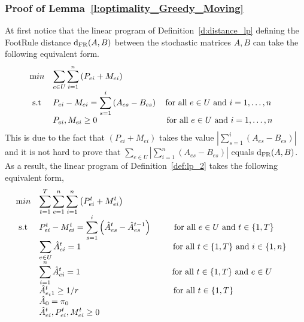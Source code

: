 \subsubsection{Proof of Lemma~\ref{l:optimality_Greedy_Moving}}
At first notice that the linear program of Definition~\ref{d:distance_lp} defining the FootRule distance $\mathrm{d}_{\mathrm{FR}}(A,B)$ between the stochastic matrices $A,B$ can take the following equivalent form. 
\begin{equation*}
    \begin{array}{ll@{}ll}
        \text min & \displaystyle \sum_{e \in U} \sum_{i = 1}^{n} \left(P_{ei} + M_{ei}\right) &\\
        \text{ s.t } & P_{ei} - M_{ei} = \displaystyle \sum_{s=1}^i \left(A_{es} - B_{es}\right)~~~\text{for all }e\in U \text{ and } i= 1,\ldots,n &&\\
        & P_{ei},M_{ei}\geq 0~~~~~~~~~~~~~~~~~~~~~~~~~\text{for all }e\in U \text{ and } i= 1,\ldots,n &\\
    \end{array}
\end{equation*}
\noindent This is due to the fact that 
$\left(P_{ei} + M_{ei}\right)$ takes the value $|\sum_{s=1}^i \left(A_{es} - B_{es}\right)|$ and it is not hard to prove that $\sum_{e \in U} |\sum_{i = 1}^{n}\left(A_{es} - B_{es}\right)|$ equals $\mathrm{d}_{\mathrm{FR}}(A,B)$. As a result, the linear program of Definition~\ref{def:lp_2} takes the following equivalent form,
\begin{equation*}
    \begin{array}{ll@{}ll}
        \text min & \displaystyle \sum_{t=1}^T\sum_{e = 1}^{n} \sum_{i = 1}^{n} \left(P_{ei}^t + M_{ei}^t\right) &\\
        \text{ s.t } & P_{ei}^t - M_{ei}^t = \displaystyle \sum_{s=1}^i \left(\hat{A}_{es}^t - \hat{A}_{es}^{t-1}\right)~~~~~~~~\text{for all }e\in U \text{ and } t \in \{1,T\} &&\\
        & \displaystyle \sum_{e \in U} \hat{A}_{ei}^t = 1 ~~~~~~~~~~~~~~~~~~~~~~~~~~~~~~~~~\text{for all }t \in \{1,T\} \text{ and }i \in \{1,n\}
        &\\
        & \displaystyle \sum_{i =1}^n \hat{A}_{ei}^t = 1~~~~~~~~~~~~~~~~~~~~~~~~~~~~~~~~~\text{for all }t \in \{1,T\} \text{ and }e \in U
        &\\
        & \displaystyle \hat{A}_{e_t 1}^t \geq 1/r ~~~~~~~~~~~~~~~~~~~~~~~~~~~~~~~~~~\text{for all }t \in \{1,T\}
        &\\
        & \displaystyle \hat{A}_0 = \pi_0&\\
        & \displaystyle\hat{A}_{ei}^t,P_{ei}^t,M_{ei}^t\geq 0&\\
    \end{array}
\end{equation*}
